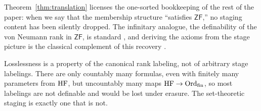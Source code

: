 \begin{remark}\label{rem:translation}
Theorem~\ref{thm:translation} licenses the one-sorted bookkeeping of the rest of the paper: when
we say that the membership structure ``satisfies $\mathsf{ZF}$,'' no staging content has been
silently dropped. The infinitary analogue, the definability of the von Neumann rank in
$\mathsf{ZF}$, is standard \citep[Ch.~6]{Jech2003}, and deriving the axioms from the stage picture
is the classical complement of this recovery \citep{Scott1974,Boolos1971}.

Losslessness is a property of the canonical rank labeling, not of arbitrary stage labelings.
There are only countably many formulas, even with finitely many parameters from $\mathrm{HF}$, but
uncountably many maps $\mathrm{HF}\to\mathrm{Ord}_{\mathrm{fin}}$, so most labelings are not definable and would
be lost under erasure. The set-theoretic staging is exactly one that is not.
\end{remark}
